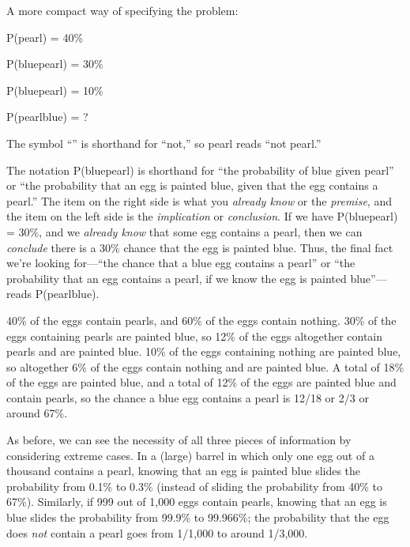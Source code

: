 {
 A more compact way of specifying the problem:}

{\centering
 P(pearl) = 40\%
\par}


\bigskip

{\centering
 P(blue{\textbar}pearl) = 30\%
\par}


\bigskip

{\centering
 P(blue{\textbar}{\textlnot}pearl) = 10\%
\par}


\bigskip

{\centering
 P(pearl{\textbar}blue) = ?
\par}


\bigskip

{
 The symbol ``{\textlnot}'' is
shorthand for ``not,'' so
{\textlnot}pearl reads ``not
pearl.''}

{
 The notation P(blue{\textbar}pearl) is shorthand for
``the probability of blue given
pearl'' or ``the probability that an
egg is painted blue, given that the egg contains a
pearl.'' The item on the right side is what you
\textit{already know} or the \textit{premise}, and the item on the left
side is the \textit{implication} or \textit{conclusion}. If we have
P(blue{\textbar}pearl) = 30\%, and we \textit{already know} that some
egg contains a pearl, then we can \textit{conclude} there is a 30\%
chance that the egg is painted blue. Thus, the final fact
we're looking for---``the chance that
a blue egg contains a pearl'' or
``the probability that an egg contains a pearl, if we
know the egg is painted blue''---reads
P(pearl{\textbar}blue).}

{
 40\% of the eggs contain pearls, and 60\% of the eggs contain
nothing. 30\% of the eggs containing pearls are painted blue, so 12\%
of the eggs altogether contain pearls and are painted blue. 10\% of the
eggs containing nothing are painted blue, so altogether 6\% of the eggs
contain nothing and are painted blue. A total of 18\% of the eggs are
painted blue, and a total of 12\% of the eggs are painted blue and
contain pearls, so the chance a blue egg contains a pearl is 12/18 or
2/3 or around 67\%.}

{
 As before, we can see the necessity of all three pieces of
information by considering extreme cases. In a (large) barrel in which
only one egg out of a thousand contains a pearl, knowing that an egg is
painted blue slides the probability from 0.1\% to 0.3\% (instead of
sliding the probability from 40\% to 67\%). Similarly, if 999 out of
1,000 eggs contain pearls, knowing that an egg is blue slides the
probability from 99.9\% to 99.966\%; the probability that the egg does
\textit{not} contain a pearl goes from 1/1,000 to around 1/3,000.}

